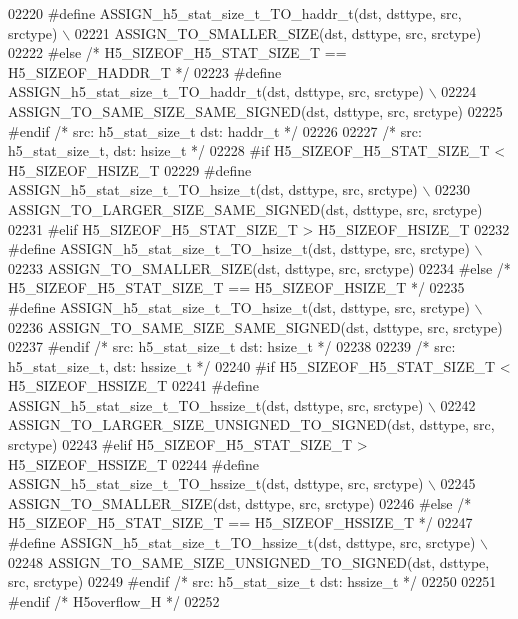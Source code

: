 \begin{DoxyCode}
02220 \textcolor{preprocessor}{    #define ASSIGN\_h5\_stat\_size\_t\_TO\_haddr\_t(dst, dsttype, src, srctype) \(\backslash\)}
02221 \textcolor{preprocessor}{        ASSIGN\_TO\_SMALLER\_SIZE(dst, dsttype, src, srctype)}
02222 \textcolor{preprocessor}{#else }\textcolor{comment}{/* H5\_SIZEOF\_H5\_STAT\_SIZE\_T == H5\_SIZEOF\_HADDR\_T */}\textcolor{preprocessor}{}
02223 \textcolor{preprocessor}{    #define ASSIGN\_h5\_stat\_size\_t\_TO\_haddr\_t(dst, dsttype, src, srctype) \(\backslash\)}
02224 \textcolor{preprocessor}{        ASSIGN\_TO\_SAME\_SIZE\_SAME\_SIGNED(dst, dsttype, src, srctype)}
02225 \textcolor{preprocessor}{#endif }\textcolor{comment}{/* src: h5\_stat\_size\_t dst: haddr\_t */}\textcolor{preprocessor}{}
02226 
02227 \textcolor{comment}{/* src: h5\_stat\_size\_t, dst: hsize\_t */}
02228 \textcolor{preprocessor}{#if H5\_SIZEOF\_H5\_STAT\_SIZE\_T < H5\_SIZEOF\_HSIZE\_T}
02229 \textcolor{preprocessor}{    #define ASSIGN\_h5\_stat\_size\_t\_TO\_hsize\_t(dst, dsttype, src, srctype) \(\backslash\)}
02230 \textcolor{preprocessor}{        ASSIGN\_TO\_LARGER\_SIZE\_SAME\_SIGNED(dst, dsttype, src, srctype)}
02231 \textcolor{preprocessor}{#elif H5\_SIZEOF\_H5\_STAT\_SIZE\_T > H5\_SIZEOF\_HSIZE\_T}
02232 \textcolor{preprocessor}{    #define ASSIGN\_h5\_stat\_size\_t\_TO\_hsize\_t(dst, dsttype, src, srctype) \(\backslash\)}
02233 \textcolor{preprocessor}{        ASSIGN\_TO\_SMALLER\_SIZE(dst, dsttype, src, srctype)}
02234 \textcolor{preprocessor}{#else }\textcolor{comment}{/* H5\_SIZEOF\_H5\_STAT\_SIZE\_T == H5\_SIZEOF\_HSIZE\_T */}\textcolor{preprocessor}{}
02235 \textcolor{preprocessor}{    #define ASSIGN\_h5\_stat\_size\_t\_TO\_hsize\_t(dst, dsttype, src, srctype) \(\backslash\)}
02236 \textcolor{preprocessor}{        ASSIGN\_TO\_SAME\_SIZE\_SAME\_SIGNED(dst, dsttype, src, srctype)}
02237 \textcolor{preprocessor}{#endif }\textcolor{comment}{/* src: h5\_stat\_size\_t dst: hsize\_t */}\textcolor{preprocessor}{}
02238 
02239 \textcolor{comment}{/* src: h5\_stat\_size\_t, dst: hssize\_t */}
02240 \textcolor{preprocessor}{#if H5\_SIZEOF\_H5\_STAT\_SIZE\_T < H5\_SIZEOF\_HSSIZE\_T}
02241 \textcolor{preprocessor}{    #define ASSIGN\_h5\_stat\_size\_t\_TO\_hssize\_t(dst, dsttype, src, srctype) \(\backslash\)}
02242 \textcolor{preprocessor}{        ASSIGN\_TO\_LARGER\_SIZE\_UNSIGNED\_TO\_SIGNED(dst, dsttype, src, srctype)}
02243 \textcolor{preprocessor}{#elif H5\_SIZEOF\_H5\_STAT\_SIZE\_T > H5\_SIZEOF\_HSSIZE\_T}
02244 \textcolor{preprocessor}{    #define ASSIGN\_h5\_stat\_size\_t\_TO\_hssize\_t(dst, dsttype, src, srctype) \(\backslash\)}
02245 \textcolor{preprocessor}{        ASSIGN\_TO\_SMALLER\_SIZE(dst, dsttype, src, srctype)}
02246 \textcolor{preprocessor}{#else }\textcolor{comment}{/* H5\_SIZEOF\_H5\_STAT\_SIZE\_T == H5\_SIZEOF\_HSSIZE\_T */}\textcolor{preprocessor}{}
02247 \textcolor{preprocessor}{    #define ASSIGN\_h5\_stat\_size\_t\_TO\_hssize\_t(dst, dsttype, src, srctype) \(\backslash\)}
02248 \textcolor{preprocessor}{        ASSIGN\_TO\_SAME\_SIZE\_UNSIGNED\_TO\_SIGNED(dst, dsttype, src, srctype)}
02249 \textcolor{preprocessor}{#endif }\textcolor{comment}{/* src: h5\_stat\_size\_t dst: hssize\_t */}\textcolor{preprocessor}{}
02250 
02251 \textcolor{preprocessor}{#endif }\textcolor{comment}{/* H5overflow\_H */}\textcolor{preprocessor}{}
02252 
\end{DoxyCode}
